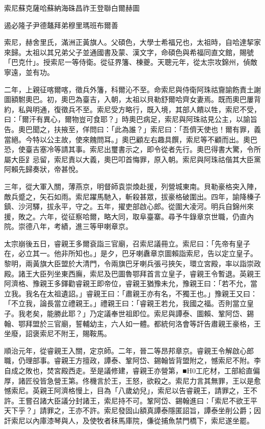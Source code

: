 
\begin{pinyinscope}
索尼蘇克薩哈蘇納海硃昌祚王登聯白爾赫圖

遏必隆子尹德鼇拜弟穆里瑪班布爾善

索尼，赫舍里氏，滿洲正黃旗人。父碩色，大學士希福兄也，太祖時，自哈達挈家來歸。太祖以其兄弟父子並通國書及蒙、漢文字，命碩色與希福同直文館，賜號「巴克什」。授索尼一等侍衛。從征界籓、棟夔。天聰元年，從太宗攻錦州，偵敵寧遠，並有功。

二年，上親征喀爾喀，徵兵外籓，科爾沁不至。命索尼與侍衛阿珠祜齎諭飭責土謝圖額駙奧巴。初，奧巴為臺吉，入朝，太祖以貝勒舒爾哈齊女妻焉。既而奧巴屢背約，私與明通，復徵兵不至。索尼受方略行，既入境，其部人饋以牲，索尼不受，曰：「爾汗有異心，爾物豈可食耶？」時奧巴病足，索尼與阿珠祜見公主，以諭旨告。奧巴聞之，扶掖至，佯問曰：「此為誰？」索尼曰：「吾儕天使也！爾有罪，義當絕。今特以公主故，使來餽問耳。」奧巴顧左右趣具饌，索尼等不顧而出。奧巴恐，使臺吉塞冷等請其事。索尼出璽書示之，即令從者先行。奧巴得書大驚，令所屬大臣𧾷忌留，索尼責以大義，奧巴叩首悔罪，原入朝。索尼與阿珠祜偕其大臣黨阿賴先歸奏狀，帝甚悅。

三年，從大軍入關，薄燕京，明督師袁崇煥赴援，列營城東南。貝勒豪格突入陣，敵兵蹙之，矢石如雨。索尼躍馬馳入，斬殺甚眾，拔豪格破圍出。四年，諭降榛子鎮、沙河驛，拔永平，守之。五年，擢吏部啟心郎。從圍大凌河。明兵自錦州來援，敗之。六年，從征察哈爾，略大同，取阜臺寨。尋予牛錄章京世職，仍直內院。崇德八年，考績，進三等甲喇章京。

太宗崩後五日，睿親王多爾袞詣三官廟，召索尼議冊立。索尼曰：「先帝有皇子在，必立其一。他非所知也。」是夕，巴牙喇纛章京圖賴詣索尼，告以定立皇子。黎明，兩黃旗大臣盟於大清門，令兩旗巴牙喇兵張弓挾矢，環立宮殿，率以詣崇政殿。諸王大臣列坐東西廡，索尼及巴圖魯鄂拜首言立皇子，睿親王令暫退。英親王阿濟格、豫親王多鐸勸睿親王即帝位，睿親王猶豫未允，豫親王曰：「若不允，當立我。我名在太祖遺詔。」睿親王曰：「肅親王亦有名，不獨王也。」豫親王又曰：「不立我，論長當立禮親王。」禮親王曰：「睿親王若允，我國之福。否則當立皇子。我老矣，能勝此耶？」乃定議奉世祖即位。索尼與譚泰、圖賴、鞏阿岱、錫翰、鄂拜盟於三官廟，誓輔幼主，六人如一體。都統何洛會等訐告肅親王豪格，王坐廢，詔褒索尼不附王，賜鞍馬。

順治元年，從睿親王入關，定京師。二年，晉二等昂邦章京。睿親王令解啟心郎職，仍理部事。睿親王方擅政，譚泰、鞏阿岱、錫翰皆背盟附之，憾索尼不附。李自成之敗也，焚宮殿西走。至是議修建，睿親王亦營第，■H0工庀材，工部給直偏厚，諸匠役皆急營王第。佟機言於王，王怒，欲殺之。索尼力言其無罪，王以是愈憾索尼。英親王阿濟格慢上，目為「八歲幼兒」，索尼以告睿親王，請罪之，王不許。王嘗召諸大臣議分封諸王，索尼持不可。鞏阿岱、錫翰進曰：「索尼不欲王平天下乎？」請罪之，王亦不許。索尼發固山額真譚泰隱匿詔旨，譚泰坐削公爵；因訐索尼以內庫漆琴與人，及使牧者秣馬庫院，傔從捕魚禁門橋下，索尼遂坐罷。


\end{pinyinscope}
